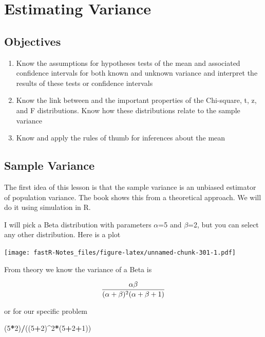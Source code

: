 \documentclass[]{book}
\newenvironment{Shaded}{\begin{snugshade}}{\end{snugshade}}
\newcommand{\DecValTok}[1]{\textcolor[rgb]{0.00,0.00,0.81}{#1}}
\newcommand{\OperatorTok}[1]{\textcolor[rgb]{0.81,0.36,0.00}{\textbf{#1}}}
\newcommand{\NormalTok}[1]{#1}
\providecommand{\tightlist}{%
  \setlength{\itemsep}{0pt}\setlength{\parskip}{0pt}}
\theoremstyle{definition}
\theoremstyle{definition}
\theoremstyle{definition}
\theoremstyle{remark}
\begin{document}
\hypertarget{L22}{\section{Estimating Variance}\label{L22}}

\subsection{Objectives}\label{objectives-21}

\begin{enumerate}
\def\labelenumi{\arabic{enumi}.}
\tightlist
\item
  Know the assumptions for hypotheses tests of the mean and associated
  confidence intervals for both known and unknown variance and interpret
  the results of these tests or confidence intervals\\
\item
  Know the link between and the important properties of the Chi-square,
  t, z, and F distributions. Know how these distributions relate to the
  sample variance\\
\item
  Know and apply the rules of thumb for inferences about the mean
\end{enumerate}

\subsection{Sample Variance}\label{sample-variance}

The first idea of this lesson is that the sample variance is an unbiased
estimator of population variance. The book shows this from a theoretical
approach. We will do it using simulation in R.

I will pick a Beta distribution with parameters \(\alpha\)=5 and
\(\beta\)=2, but you can select any other distribution. Here is a plot

\texttt{[image: fastR-Notes\_files/figure-latex/unnamed-chunk-301-1.pdf]}

From theory we know the variance of a Beta is

\[{\alpha \beta \over (\alpha + \beta)^{2}(\alpha + \beta +1)}\]

or for our specific problem

\begin{Shaded}
\begin{Highlighting}[]
\NormalTok{(}\DecValTok{5}\OperatorTok{*}\DecValTok{2}\NormalTok{)}\OperatorTok{/}\NormalTok{((}\DecValTok{5}\OperatorTok{+}\DecValTok{2}\NormalTok{)}\OperatorTok{^}\DecValTok{2}\OperatorTok{*}\NormalTok{(}\DecValTok{5}\OperatorTok{+}\DecValTok{2}\OperatorTok{+}\DecValTok{1}\NormalTok{))}
\end{Highlighting}
\end{Shaded}
\end{document}
